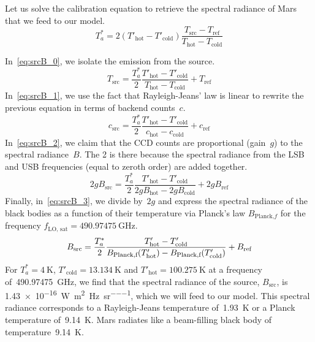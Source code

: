 Let us solve the calibration equation to retrieve the spectral radiance of Mars that we feed to our model.
\begin{equation}
    T_a^* =
    2
    (T'_\text{hot} - T'_\text{cold})
    \frac{
        T_\text{src} - T_\text{ref}
    }{
        T_\text{hot} - T_\text{cold}
    }
\end{equation}

In~\cref{eq:srcB_0}, we isolate the emission from the source.
\begin{equation}
    T_\text{src}
    =
    \frac{T_a^*}{2}
    \frac{T'_\text{hot} - T'_\text{cold}}{T_\text{hot} - T_\text{cold}}
    +
    T_\text{ref}
    \label{eq:srcB_0}
\end{equation}
In~\cref{eq:srcB_1}, we use the fact that Rayleigh-Jeans' law is linear to rewrite the previous equation in terms of backend counts~$c$.
\begin{equation}
    c_\text{src}
    =
    \frac{T_a^*}{2}
    \frac{T'_\text{hot} - T'_\text{cold}}{c_\text{hot} - c_\text{cold}}
    +
    c_\text{ref}
    \label{eq:srcB_1}
\end{equation}
In~\cref{eq:srcB_2}, we claim that the CCD counts are proportional (gain~$g$) to the spectral radiance~$B$.  The 2 is there because the spectral radiance from the LSB and USB frequencies (equal to zeroth order) are added together.
\begin{equation}
    2g B_\text{src}
    =
    \frac{T_a^*}{2}
    \frac{T'_\text{hot} - T'_\text{cold}}{2g B_\text{hot} - 2g B_\text{cold}}
    +
    2g B_\text{ref}
    \label{eq:srcB_2}
\end{equation}
Finally, in~\cref{eq:srcB_3}, we divide by~$2g$ and express the spectral radiance of the black bodies as a function of their temperature
via Planck's law $B_{\text{Planck,}f}$
for the frequency $f_\text{LO, sat}=\SI{490.97475}{\giga\hertz}$.
\begin{equation}
    \\
    B_\text{src}
    =
    \frac{T_a^*}{2}
    \frac{T'_\text{hot} - T'_\text{cold}}{B_\text{Planck,f}(T'_\text{hot}) - B_\text{Planck,f}(T'_\text{cold})}
    +
    B_\text{ref}
    \label{eq:srcB_3}
\end{equation}
For $T_a^*=\SI{4}{\kelvin}$, $T'_\text{cold}=\SI{13.134}{\kelvin}$ and 
$T'_\text{hot}=\SI{100.275}{\kelvin}$
at a frequency of~\SI{490.97475}{\giga\hertz},
we find that the spectral radiance of the source,
$B_\text{src}$, is \SI{1.43e-16}{\watt\per\meter\squared\per\hertz\per\steradian}, which we will feed to our model.
This spectral radiance corresponds to a Rayleigh-Jeans temperature of~\SI{1.93}{\kelvin} or a Planck temperature of~\SI{9.14}{\kelvin}.
Mars radiates like a beam-filling black body of temperature~\SI{9.14}{\kelvin}.

